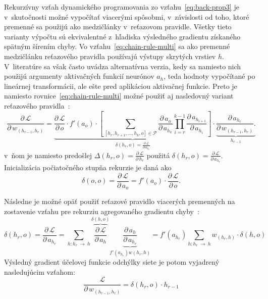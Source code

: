     Rekurzívny vzťah dynamického programovania zo vzťahu~\ref{eq:back-prop3} je v~skutočnosti možné vypočítať viacerými spôsobmi, v~závislosti od toho, ktoré premenné sa použijú ako medzičlánky v~reťazovom pravidle. Všetky tieto varianty výpočtu sú ekvivalentné z~hľadiska výsledného gradientu získaného spätným šírením chyby. Vo vzťahu~\ref{eq:chain-rule-multi} sa ako premenné medzičlánku reťazového pravidla používajú výstupy skrytých vrstiev $h$. V~literatúre sa však často uvádza alternatívna verzia, kedy sa namiesto nich použijú argumenty aktivačných funkcií neurónov $a_h$, teda hodnoty vypočítané po lineárnej transformácii, ale ešte pred aplikáciou aktivačnej funkcie. Preto je namiesto rovnice~\ref{eq:chain-rule-multi} možné použiť aj nasledovný variant reťazového pravidla~\cite{aggarwalNeuralNetworksDeep2018}:
    \begin{equation}
      \frac{\partial\, \mathcal{L}}{\partial\, w_{(h_{r-1},h_r)}} = 
      \underbrace{
        \frac{\partial\, \mathcal{L}}{\partial\, o} \cdot f'(a_o) \cdot
          \left[ \sum_{[h_r, h_{r+1},\dots,h_k,o]\in \mathcal{P}} 
            \frac{\partial\, a_o}{\partial\, a_{h_k}} \prod_{i=r}^{k-1} \frac{\partial\, a_{h_{i+1}}}{\partial\, a_{h_i}}
        \right] }_{\delta(h_r, o) = \frac{\partial\, \mathcal{L}}{\partial\, a_{h_r}}} \cdot
      \underbrace{
        \frac{\partial\, a_{h_r}}{\partial\, w_{(h_{r-1},h_r)}}.
      }_{h_{r-1}}
      \label{eq:chain-rule-multi2}
    \end{equation}
    v~ňom je namiesto predošlej  $\Delta (h_r,o) = \frac{\partial\, \mathcal{L}}{\partial\, h_r}$ použitá $\delta (h_r,o) = \frac{\partial\, \mathcal{L}}{\partial\, a_{h_r}}$. Inicializácia počiatočného stupňa rekurzie je daná ako
    \begin{equation}
      \delta (o,o) = \frac{\partial\, \mathcal{L}}{\partial\, a_o} = f'(a_o) \cdot \frac{\partial\, \mathcal{L}}{\partial\, o}.
    \end{equation}

    Následne je možné opäť použiť reťazové pravidlo viacerých premenných na zostavenie vzťahu pre rekurziu agregovaného gradientu chyby~\cite{aggarwalNeuralNetworksDeep2018}:
    \begin{equation}
      \delta (h_r,o) = \frac{\partial\, \mathcal{L}}{\partial\, a_{h_r}} 
                     = \sum_{h:h_r \:\rightarrow\: h} 
                     \overbrace{
                      \frac{\partial\, \mathcal{L}}{\partial\, a_h}
                     }^{\delta (h,o)}
                     \underbrace{
                      \frac{\partial\, a_h}{\partial\, a_{h_r}}
                     }_{f'(a_{h_r}) w(h_r,h)}
                     = f'(a_{h_r}) \sum_{h:h_r \:\rightarrow\: h} w_{(h_r,h)} \cdot \delta(h,o)
    \end{equation}
    Výsledný gradient účelovej funkcie odchýlky siete je potom vyjadrený nasledujúcim vzťahom:
    \begin{equation}
      \frac{\mathcal{L}}{\partial\, w_{(h_{r-1},h_r)}} = \delta (h_r,o) \cdot h_{r-1}
    \end{equation}

